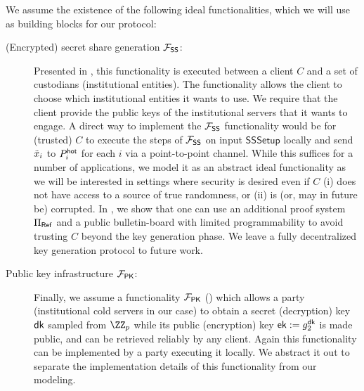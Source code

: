 We assume the existence of the following ideal functionalities, which we will use as building blocks for our protocol:
\begin{description}
\item[(Encrypted) secret share generation $\mathcal{F}_\mathsf{SS}$:]
    Presented in , this functionality is executed between a client $C$ 
    and a set of custodians (institutional entities). %
    The functionality allows the client to choose which institutional entities it wants to use. 
    We require that the client provide the public keys of the institutional servers that it wants to engage. 
    A direct way to implement the $\mathcal{F}_\mathsf{SS}$ functionality would be for (trusted) $C$ to execute the steps of $\mathcal{F}_\mathsf{SS}$ on input $\mathsf{SSSetup}$ locally and send $\tilde{x}_i$ to $P_i^{\mathsf{hot}}$ for each $i$ via a point-to-point channel.
    While this suffices for a number of applications, we model it as an abstract ideal functionality as we will be interested in settings where security is desired even if $C$ (i) does not have access to a source of true randomness, or (ii)  is (or, may in future be) corrupted. 
    In , we show that one can use an additional proof system $\Pi_{\sf Ref}$ and a public bulletin-board with limited programmability to avoid trusting $C$ beyond the key generation phase. We leave a fully decentralized key generation protocol to future work.
    
\item[Public key infrastructure $\mathcal{F}_\mathsf{PK}$:] 
Finally, we assume a functionality $\mathcal{F}_\mathsf{PK}$ () which allows a party (institutional cold servers in our case) to obtain a secret (decryption) key $\mathsf{dk}$ sampled from $\ZZ_p$ while its public (encryption) key $\mathsf{ek} := g_2^{\mathsf{dk}}$ is made public, and can be retrieved reliably by any client. Again this functionality can be implemented by a party executing it locally. We abstract it out to separate the implementation details of this functionality from our modeling.

\end{description}


